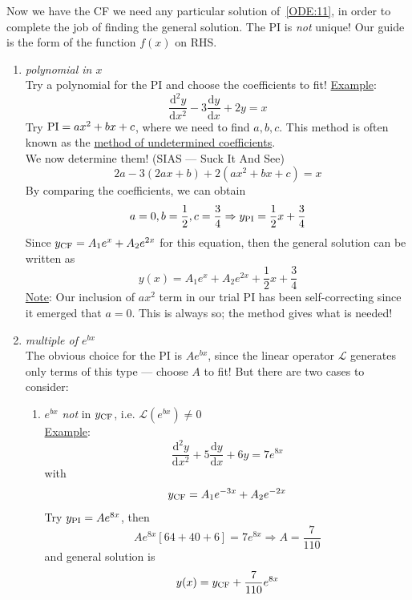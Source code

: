 \documentclass[12pt]{report}
\theoremstyle{definition}
\begin{document}
Now we have the CF we need any particular solution of \,\eqref{ODE:11},
in order to complete the job of finding the general solution.
The PI is \emph{not} unique!
Our guide is the form of the function $f(x)$ on RHS.\@
\begin{enumerate}[label = (\alph*)]
    \item \emph{polynomial in $x$} 
        \\Try a polynomial for the PI and choose the coefficients to fit!
        \underline{Example}: \[
            \frac{\mathrm{d}^{2}y}{\mathrm{d}x^{2}} - 3 \frac{\mathrm{d}y}{\mathrm{d}x} + 2y = x
        \]Try $\textnormal{PI} = ax^{2} + bx + c$, where we need to find $a, b, c$.
        This method is often known as the \underline{method of undetermined coefficients}.
        \\We now determine them! (SIAS --- Suck It And See)\[
            2a - 3(2ax + b) + 2(ax^{2} + bx + c) = x
        \]
        By comparing the coefficients, we can obtain \[
            a = 0, b = \frac{1}{2}, c = \frac{3}{4} \Rightarrow 
            y_{\textnormal{PI}} = \frac{1}{2}x + \frac{3}{4}
        \]
        Since $y_{\textnormal{CF}} = A_1 e^{x} + A_2 e^{2x}$ for this equation,
        then the general solution can be written as\[
            y(x) = A_1 e^{x} + A_2 e^{2x} + \frac{1}{2} x + \frac{3}{4}
        \]
        \underline{Note}: Our inclusion of $ax^{2}$ term in our trial PI has been 
        self-correcting since it emerged that $a = 0$. This is always so;
        the method gives what is needed!

    \item \emph{multiple of $e^{bx}$} 
        \\The obvious choice for the PI is $A e^{bx}$, since
        the linear operator $\mathscr{L}$ generates only terms of this type 
        --- choose $A$ to fit!
        But there are two cases to consider:
        \begin{enumerate}[label = (\roman*)]
            \item $e^{bx}$ \emph{not} in $y_{\textnormal{CF}}$, i.e. $\mathscr{L}(e^{bx}) \neq 0$
                \\\underline{Example}: \[
                    \frac{\mathrm{d}^{2}y}{\mathrm{d}x^{2}} + 5\frac{\mathrm{d}y}{\mathrm{d}x} + 6y = 7e^{8x}
                \]with\[
                y_{\textnormal{CF}} = A_1 e^{-3x} + A_2 e^{-2x}
                \]
                Try $y_{\textnormal{PI}} = A e^{8x}$, then\[
                    A e^{8x}[64 + 40 + 6] = 7 e^{8x} \Rightarrow A = \frac{7}{110}
                \]
                and general solution is\[
                    y(x) = y_{\textnormal{CF}} + \frac{7}{110} e^{8x}
                \]


\end{enumerate}
\end{enumerate}
\end{document}
